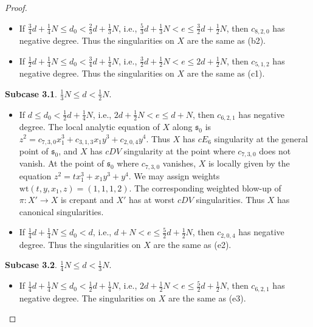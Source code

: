 \documentclass[a4paper,11pt]{amsart}
\newcommand{\s}{\ensuremath{\mathfrak{s}}}
\theoremstyle{definition}
\theoremstyle{remark}
\numberwithin{equation}{section}
\begin{document}
\begin{proof}
\begin{itemize}
        \item [(c3)] If $\frac{3}{4}d+\frac{1}{4}N\leq d_0<\frac{2}{3}d+\frac{1}{3}N$, i.e., $\frac53d + \frac13N < e \le\frac32d + \frac12N$, then $c_{8,2,0}$ has negative degree. Thus the singularities on $X$ are the same as (b2). %

        \item [(d3)] If $\frac{1}{2}d+\frac{1}{4}N\leq d_0<\frac{3}{4}d+\frac{1}{4}N$, i.e., $\frac{3}{2}d+\frac{1}{2}N<e\leq 2d+\frac{1}{2}N$, then $c_{5,1,2}$ has negative degree. Thus the singularities on $X$ are the same as (c1). %
    \end{itemize}
    
    \textbf{Subcase 3.1}. $\frac{1}{3}N\leq d<\frac{1}{2}N$.

    \begin{itemize}
        \item [(e3)] If $d\leq d_0<\frac{1}{2}d+\frac{1}{4}N$, i.e., $2d+\frac{1}{2}N<e\leq d+N$, then $c_{6,2,1}$ has negative degree. The local analytic equation of $X$ along $\s_0$ is $z^2=c_{7,3,0}x_1^3 + c_{3,1,3}x_1y^3 + c_{2,0,4}y^4$. Thus $X$ has $cE_6$ singularity at the general point of $\s_0$, and $X$ has $cDV$ singularity at the point where $c_{7,3,0}$ does not vanish. At the point of $\s_0$ where $c_{7,3,0}$ vanishes, $X$ is locally given by the equation $z^2=tx_1^3+x_1y^3+y^4$. We may assign weights $\mathrm{wt}(t,y,x_1,z)=(1,1,1,2)$. The corresponding weighted blow-up of $\pi: X'\to X$ is crepant and $X'$ has at worst $cDV$ singularities. Thus $X$ has canonical singularities.

        \item [(f3)] If $\frac{1}{4}d+\frac{1}{4}N\leq d_0<d$, i.e., $d+N<e\leq \frac{5}{2}d+\frac{1}{2}N$, then $c_{2,0,4}$ has negative degree. %
        Thus the singularities on $X$ are the same as (e2). 
    \end{itemize}

    \textbf{Subcase 3.2}. $\frac{1}{4}N \leq d < \frac{1}{3}N$.

    \begin{itemize}
          \item[(e3')] If $\frac{1}{4}d+\frac{1}{4}N\leq d_0<\frac{1}{2}d+\frac{1}{4}N$, i.e., $2d+\frac{1}{2}N<e\leq \frac{5}{2}d+\frac{1}{2}N$, then $c_{6,2,1}$ has negative degree. %
          The singularities on $X$ are the same as (e3). 
    \end{itemize}
    

\end{proof}
\end{document}
